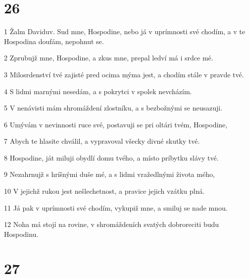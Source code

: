 \chapter{26}

\par 1 Žalm Daviduv. Sud mne, Hospodine, nebo já v uprímnosti své chodím, a v te Hospodina doufám, nepohnut se.
\par 2 Zprubujž mne, Hospodine, a zkus mne, prepal ledví má i srdce mé.
\par 3 Milosrdenství tvé zajisté pred ocima mýma jest, a chodím stále v pravde tvé.
\par 4 S lidmi marnými nesedám, a s pokrytci v spolek nevcházím.
\par 5 V nenávisti mám shromáždení zlostníku, a s bezbožnými se neusazuji.
\par 6 Umývám v nevinnosti ruce své, postavuji se pri oltári tvém, Hospodine,
\par 7 Abych te hlasite chválil, a vypravoval všecky divné skutky tvé.
\par 8 Hospodine, ját miluji obydlí domu tvého, a místo príbytku slávy tvé.
\par 9 Nezahrnujž s hríšnými duše mé, a s lidmi vražedlnými života mého,
\par 10 V jejichž rukou jest nešlechetnost, a pravice jejich vzátku plná.
\par 11 Já pak v uprímnosti své chodím, vykupiž mne, a smiluj se nade mnou.
\par 12 Noha má stojí na rovine, v shromáždeních svatých dobroreciti budu Hospodinu.

\chapter{27}


